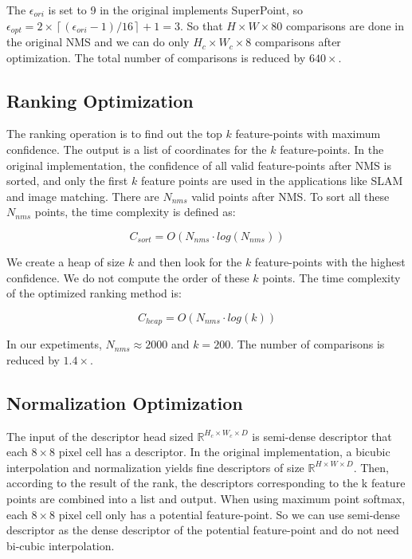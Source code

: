 The $\epsilon _{ori}$ is set to 9 in the original implements SuperPoint, so $\epsilon _{opt} = 2\times \left \lceil (\epsilon _{ori}-1)/16 \right \rceil +1 = 3$. So that $H \times W \times 80 $ comparisons are done in the original NMS and we can do only $H_c \times W_c \times 8$ comparisons after optimization. The total number of comparisons is reduced by $640\times$.

\subsection{Ranking Optimization}

The ranking operation is to find out the top $k$ feature-points with maximum confidence. 
The output is a list of coordinates for the $k$ feature-points. 
In the original implementation, the confidence of all valid feature-points after NMS is sorted, and only the first $k$ feature points are used in the applications like SLAM and image matching. 
There are $N_{nms}$ valid points after NMS. To sort all these $N_{nms}$ points, the time complexity is defined as:

\begin{equation}
    C_{sort} = O(N_{nms} \cdot log(N_{nms}))
    \label{equ:csort}
\end{equation}

We create a heap of size $k$ and then look for the $k$ feature-points with the highest confidence. We do not compute the order of these $k$ points. The time complexity of the optimized ranking method is:

\begin{equation}
    C_{heap} = O(N_{nms} \cdot log(k))
    \label{equ:optsort}
\end{equation}

In our expetiments, $N_{nms} \approx 2000$ and $k = 200$. The number of comparisons is reduced by $1.4\times$.

\subsection{Normalization Optimization}

The input of the descriptor head sized $\mathbb{R}^{H_c\times W_c\times D}$ is semi-dense descriptor that each $8\times8$ pixel cell has a descriptor. In the original implementation, a bicubic interpolation and normalization yields fine descriptors of size $\mathbb{R}^{H\times W\times D}$. Then, according to the result of the rank, the descriptors corresponding to the k feature points are combined into a list and output. When using maximum point softmax, each $8\times8$ pixel cell only has a potential feature-point. So we can use semi-dense descriptor as the dense descriptor of the potential feature-point and do not need bi-cubic interpolation.

